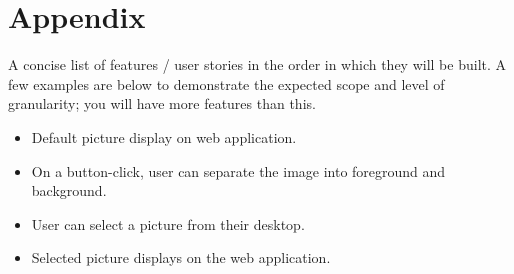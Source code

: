 \documentclass[11pt]{article}
\begin{document}
\newpage
\section*{Appendix}
A concise list of features / user stories in the order in which they will be built. A few examples are below to demonstrate the expected scope and level of granularity; you will have more features than this.
\begin{itemize}
	\item Default picture display on web application.
	\item On a button-click, user can separate the image into foreground and background.
	\item User can select a picture from their desktop.
	\item Selected picture displays on the web application.
\end{itemize}





\end{document}
